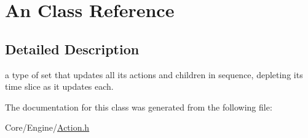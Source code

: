 \hypertarget{classAn}{\section{An Class Reference}
\label{classAn}
}


\subsection{Detailed Description}
a type of set that updates all its actions and children in sequence, depleting its time slice as it updates each. 

The documentation for this class was generated from the following file\-:\begin{DoxyCompactItemize}
\item 
Core/\-Engine/\hyperlink{Action_8h}{Action.\-h}\end{DoxyCompactItemize}
